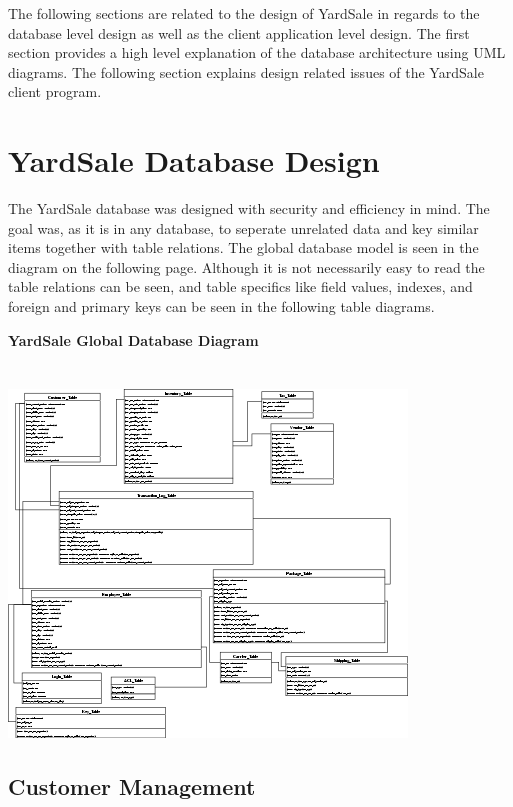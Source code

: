 \documentclass{report}
\begin{document}
\begin{itemize}
    The following sections are related to the design of YardSale
    in regards to the database level design as well as the client
    application level design. The first section provides a high level
    explanation of the database architecture using UML diagrams. The
    following section explains design related issues of the YardSale
    client program.

\section{YardSale Database Design}

    The YardSale database was designed with security and efficiency in
    mind. The goal was, as it is in any database, to seperate unrelated
    data and key similar items together with table relations. The global
    database model is seen in the diagram on the following page. Although
    it is not necessarily easy to read the table relations can be seen, and
    table specifics like field values, indexes, and foreign and primary keys
    can be seen in the following table diagrams.

    \newpage

    {\bf YardSale Global Database Diagram}\\
    \\
    \\
    \includegraphics{Database_Layout.png}

    \newpage

        \subsection{Customer Management}


\end{itemize}
\end{document}
